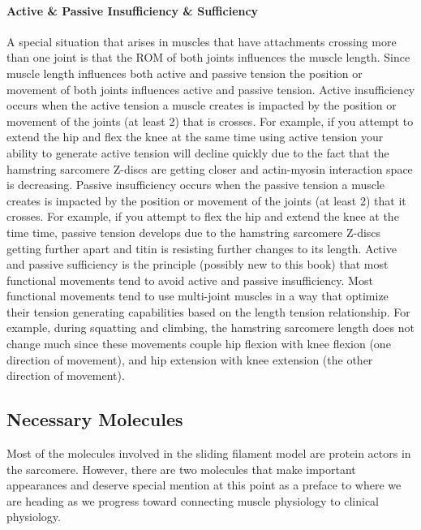 \paragraph{Active \& Passive Insufficiency & Sufficiency}
A special situation that arises in muscles that have attachments crossing more than one joint is that the ROM of both joints influences the muscle length. Since muscle length influences both active and passive tension the position or movement of both joints influences active and passive tension.
Active insufficiency occurs when the active tension a muscle creates is impacted by the position or movement of the joints (at least 2) that is crosses. For example, if you attempt to extend the hip and flex the knee at the same time using active tension your ability to generate active tension will decline quickly due to the fact that the hamstring sarcomere Z-discs are getting closer and actin-myosin interaction space is decreasing.
Passive insufficiency occurs when the passive tension a muscle creates is impacted by the position or movement of the joints (at least 2) that it crosses. For example, if you attempt to flex the hip and extend the knee at the time time, passive tension develops due to the hamstring sarcomere Z-discs getting further apart and titin is resisting further changes to its length.\footnotemark{}
Active and passive sufficiency is the principle (possibly new to this book) that most functional movements tend to avoid active and passive insufficiency. Most functional movements tend to use multi-joint muscles in a way that optimize their tension generating capabilities based on the length tension relationship. For example, during squatting and climbing, the hamstring sarcomere length does not change much since these movements couple hip flexion with knee flexion (one direction of movement), and hip extension with knee extension (the other direction of movement).

\subsection{Necessary Molecules}
Most of the molecules involved in the sliding filament model are protein actors in the sarcomere. However, there are two molecules that make important appearances and deserve special mention at this point as a preface to where we are heading as we progress toward connecting muscle physiology to clinical physiology.

